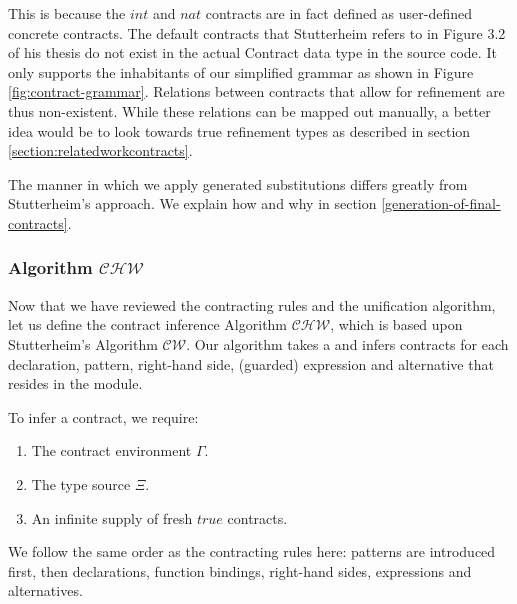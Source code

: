 \documentclass[10pt]{report}
\newcommand{\CHW}{$\mathcal{CHW}$}
\newcommand{\code}[1]{%
  {%
   \setlength{\fboxsep}{-2\fboxrule}%
   \fcolorbox{black}{light-gray}{\hspace{1.5pt}\strut\texttt{#1}\hspace{1.5pt}}%
  }%
}
\begin{document}
This is because the $int$ and $nat$ contracts are in fact defined as user-defined concrete contracts.
The default contracts that Stutterheim refers to in Figure 3.2 of his thesis do not exist in the actual Contract data type in the source code. 
It only supports the inhabitants of our simplified grammar as shown in Figure \ref{fig:contract-grammar}.
Relations between contracts that allow for refinement are thus non-existent.
While these relations can be mapped out manually, a better idea would be to look towards true refinement types as described in section \ref{section:relatedworkcontracts}.


The manner in which we apply generated substitutions differs greatly from Stutterheim's approach.
We explain how and why in section \ref{generation-of-final-contracts}.

\subsubsection{Algorithm \CHW}

Now that we have reviewed the contracting rules and the unification algorithm, let us define the contract inference Algorithm \CHW, which is based upon Stutterheim's Algorithm $\mathcal{CW}$.
Our algorithm takes a \code{Module} and infers contracts for each declaration, pattern, right-hand side, (guarded) expression and alternative that resides in the module.

To infer a contract, we require:
\begin{enumerate}
	\item The contract environment $\Gamma$.
	\item The type source $\Xi$.
	\item An infinite supply of fresh $true$ contracts.
\end{enumerate}

We follow the same order as the contracting rules here: patterns are introduced first, then declarations, function bindings, right-hand sides, expressions and alternatives.
\end{document}
